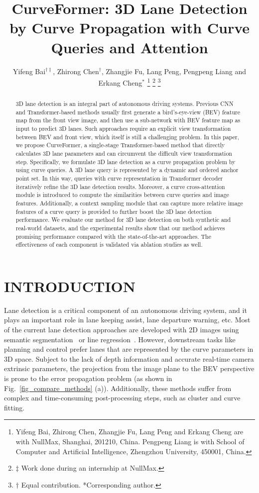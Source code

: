 \documentclass[letterpaper, 10 pt, conference]{ieeeconf}
\title{\LARGE \bf
CurveFormer: 3D Lane Detection by Curve Propagation with Curve Queries and Attention
}
\author{Yifeng Bai$^{\dagger \ddagger}$, Zhirong Chen$^{\dagger}$, Zhangjie Fu, Lang Peng, Pengpeng Liang and Erkang Cheng$^{*}$ \thanks{Yifeng Bai, Zhirong Chen, Zhangjie Fu, Lang Peng and Erkang Cheng are with NullMax, Shanghai, 201210, China. Pengpeng Liang is with School of Computer and Artificial Intelligence, Zhengzhou University, 450001, China.}
	\thanks{$\ddagger$ Work done during an internship at NullMax.}
	\thanks{$\dagger$ Equal contribution. *Corresponding author.}
}
\begin{document}
\maketitle
\thispagestyle{empty}
\pagestyle{empty}


\begin{abstract}
3D lane detection is an integral part of autonomous driving systems. Previous CNN and Transformer-based methods usually first generate a bird's-eye-view (BEV) feature map from the front view image, and then use a sub-network with BEV feature map as input to predict 3D lanes. Such approaches require an explicit view transformation between BEV and front view, which itself is still a challenging problem. In this paper, we propose CurveFormer, a single-stage Transformer-based method that directly calculates 3D lane parameters and can circumvent the difficult view transformation step. Specifically, we formulate 3D lane detection as a curve propagation problem by using curve queries. A 3D lane query is represented by a dynamic and ordered anchor point set. In this way, queries with curve representation in Transformer decoder iteratively refine the 3D lane detection results. Moreover, a curve cross-attention module is introduced to compute the similarities between curve queries and image features. Additionally, a context sampling module that can capture more relative image features of a curve query is provided to further boost the 3D lane detection performance. We evaluate our method for 3D lane detection on both synthetic and real-world datasets, and the experimental results show that our method achieves promising performance compared with the state-of-the-art approaches. The effectiveness of each component is validated via ablation studies as well.
\end{abstract}

\section{INTRODUCTION}
Lane detection is a critical component of an autonomous driving system, and it plays an important role in lane keeping assist, lane departure warning, etc. Most of the current lane detection approaches are developed with 2D images using semantic segmentation~\cite{pan2017spatial, neven2018towards, hou2019learning, zheng2020resa} or line regression~\cite{ko2020key, wang2022keypoint, chen2019pointlanenet, li2020curvelane, li2019line, 2020Keep, zheng2022clrnet, qin2020ultra}. However, downstream tasks like planning and control prefer lanes that are represented by the curve parameters in 3D space. Subject to the lack of depth information and accurate real-time camera extrinsic parameters, the projection from the image plane to the BEV perspective is prone to the error propagation problem
(as shown in Fig.~\ref{fig_compare_methods} (a)). Additionally, these methods suffer from complex and time-consuming post-processing steps, such as cluster and curve fitting. 
\end{document}
